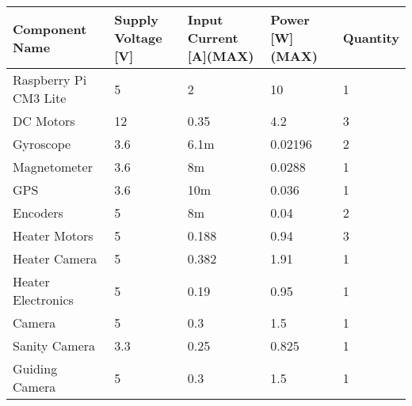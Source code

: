 

\begin{table}[]
\begin{tabular}{|l|l|l|l|l|}
\hline
\textbf{Component Name} & \textbf{Supply Voltage {[}V{]}} & \textbf{Input Current {[}A{]}(MAX)} & \textbf{Power {[}W{]} (MAX)} & \textbf{Quantity} \\ \hline
Raspberry Pi CM3 Lite   & 5                               & 2                                   & 10                           & 1                 \\ \hline
DC Motors               & 12                              & 0.35                                & 4.2                          & 3                 \\ \hline
Gyroscope               & 3.6                             & 6.1m                                & 0.02196                      & 2                 \\ \hline
Magnetometer            & 3.6                             & 8m                                  & 0.0288                       & 1                 \\ \hline
GPS                     & 3.6                             & 10m                                 & 0.036                        & 1                 \\ \hline
Encoders                & 5                               & 8m                                  & 0.04                         & 2                 \\ \hline
Heater Motors           & 5                               & 0.188                               & 0.94                         & 3                 \\ \hline
Heater Camera           & 5                               & 0.382                               & 1.91                         & 1                 \\ \hline
Heater Electronics      & 5                               & 0.19                                & 0.95                         & 1                 \\ \hline
Camera                  & 5                               & 0.3                                 & 1.5                          & 1                 \\ \hline
Sanity Camera           & 3.3                             & 0.25                                & 0.825                        & 1                 \\ \hline
Guiding Camera          & 5                               & 0.3                                 & 1.5                          & 1                 \\ \hline

\end{tabular}
\end{table}
